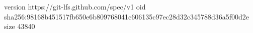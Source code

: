 version https://git-lfs.github.com/spec/v1
oid sha256:98168b451517fb650e6b809768041c606135c97ec28d32c345788d36a5f00d2e
size 43840
